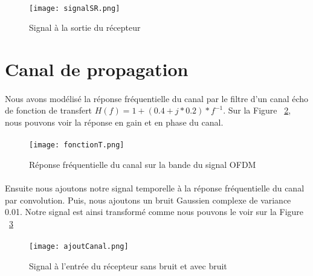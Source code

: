 \paragraph{}
\vspace{1\baselineskip}
\begin{figure}[!h]
  \centering
  \texttt{[image: signalSR.png]}
  \caption{Signal à la sortie du récepteur }
	\label{signal}
\end{figure}
\vspace{1\baselineskip}

\section{Canal de propagation}
\paragraph{}
Nous avons modélisé la réponse fréquentielle du canal par le filtre d'un canal écho de fonction de transfert $H(f)=1+(0.4+j*0.2)*f^{-1}$. Sur la Figure ~\ref{fonctionT}, nous pouvons voir la réponse en gain et en phase du canal.
\paragraph{}
\vspace{1\baselineskip}
\begin{figure}[!h]
  \centering
  \texttt{[image: fonctionT.png]}
  \caption{Réponse fréquentielle du canal sur la bande du signal OFDM}
	\label{fonctionT}
\end{figure}
\vspace{1\baselineskip}
\paragraph{}
Ensuite nous ajoutons notre signal temporelle à la réponse fréquentielle du
canal par convolution. Puis, nous ajoutons un bruit Gaussien complexe de variance
0.01. Notre signal est ainsi transformé comme nous pouvons le voir sur la Figure
~\ref{ajoutCanal}
\paragraph{}
\vspace{1\baselineskip}
\begin{figure}[!h]
  \centering
  \texttt{[image: ajoutCanal.png]}
  \caption{Signal à l'entrée du récepteur sans bruit et avec bruit}
	\label{ajoutCanal}
\end{figure}
\vspace{1\baselineskip}



